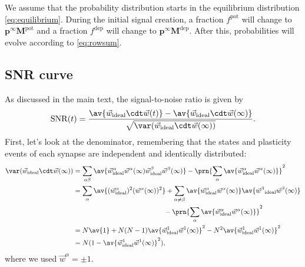 \documentclass{article} %
\DeclareMathOperator{\snr}{SNR}
\newcommand{\wv}{\vec{w}}
\newcommand{\pr}{\mathbf{p}}
\newcommand{\eq}{\pr^\infty}
\newcommand{\M}{\mathbf{M}}
\newcommand{\pot}{^{\text{pot}}}
\newcommand{\dep}{^{\text{dep}}}
\begin{document}
We assume that the probability distribution starts in the equilibrium distribution \eqref{eq:equilibrium}.
During the initial signal creation, a fraction $f\pot$ will change to $\eq\M\pot$ and a fraction $f\dep$ will change to $\eq\M\dep$.
After this, probabilities will evolve according to \eqref{eq:rowsum}.

\subsection{SNR curve}\label{sec:SNRcurve}

As discussed in the main text, the signal-to-noise ratio is given by
%
\begin{equation}\label{eq:SNRdef}
  \snr(t) = \frac{\av{\wv_\text{ideal}\cdt\wv(t)} - \av{\wv_\text{ideal}\cdt\wv(\infty)}}
     {\sqrt{\var(\wv_\text{ideal}\cdt\wv(\infty))}}.
\end{equation}
%
First, let's look at the denominator, remembering that the states and plasticity events of each synapse are independent and identically distributed:
%
\begin{equation}\label{eq:noise}
\begin{aligned}
  \var(\wv_\text{ideal}\cdt\wv(\infty))
    &= \sum_{\alpha\beta} \av{\wv^\alpha_\text{ideal}\wv^\alpha(\infty) \wv^\beta_\text{ideal}\wv^\beta(\infty)}
    - \prn{\sum_\alpha \av{\wv^\alpha_\text{ideal}\wv^\alpha(\infty)}}^2 \\
    &= \sum_{\alpha} \av{(\wv^\alpha_\text{ideal})^2(\wv^\alpha(\infty))^2}
    + \sum_{\alpha\neq\beta} \av{\wv^\alpha_\text{ideal}\wv^\alpha(\infty)}\av{\smash{\wv^\beta}_\text{ideal}\smash{\wv^\beta}(\infty)}
    \\&\phantom{= \sum_{\alpha}  \av{(\wv^\alpha_\text{ideal})^2(\wv^\alpha(\infty))^2}}
    - \prn{\sum_\alpha \av{\wv^\alpha_\text{ideal}\wv^\alpha(\infty)}}^2  \\
    &= N\av{1}
    + N(N-1)\av{\wv^1_\text{ideal}\wv^1(\infty)}^2
    - N^2\av{\wv^1_\text{ideal}\wv^1(\infty)}^2 \\
    &= N(1-\av{\wv^1_\text{ideal}\wv^1(\infty)}^2),
\end{aligned}
\end{equation}
%
where we used $\wv^\alpha=\pm1$.
\end{document}
